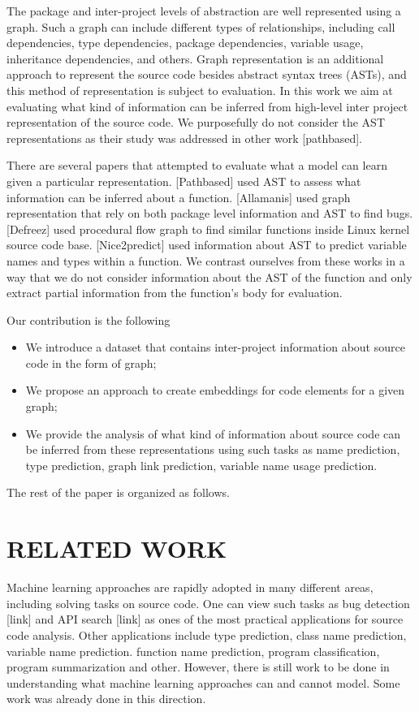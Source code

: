 \documentclass[a4paper,twoside]{article}
\begin{document}
The package and inter-project levels of abstraction are well represented using a graph. Such a graph can include different types of relationships, including call dependencies, type dependencies, package dependencies, variable usage, inheritance dependencies, and others. Graph representation is an additional approach to represent the source code besides abstract syntax trees (ASTs), and this method of representation is subject to evaluation. In this work we aim at evaluating what kind of information can be inferred from high-level inter project representation of the source code. We purposefully do not consider the AST representations as their study was addressed in other work [pathbased].

There are several papers that attempted to evaluate what a model can learn given a particular representation. [Pathbased] used AST to assess what information can be inferred about a function. [Allamanis] used graph representation that rely on both package level information and AST to find bugs. [Defreez] used procedural flow graph to find similar functions inside Linux kernel source code base. [Nice2predict] used information about AST to predict variable names and types within a function. We contrast ourselves from these works in a way that we do not consider information about the AST of the function and only extract partial information from the function's body for evaluation. 

Our contribution is the following
\begin{itemize}
    \item We introduce a dataset that contains inter-project information about source code in the form of graph;
    \item We propose an approach to create embeddings for code elements for a given graph;
    \item We provide the analysis of what kind of information about source code can be inferred from these representations using such tasks as name prediction, type prediction, graph link prediction, variable name usage prediction.
\end{itemize}

The rest of the paper is organized as follows.

\section{\uppercase{Related Work}}

Machine learning approaches are rapidly adopted in many different areas, including solving tasks on source code. One can view such tasks as bug detection [link] and API search [link] as ones of the most practical applications for source code analysis. Other applications include type prediction, class name prediction, variable name prediction. function name prediction, program classification, program summarization and other.  However, there is still work to be done in understanding what machine learning approaches can and cannot model. Some work was already done in this direction. 
\end{document}
